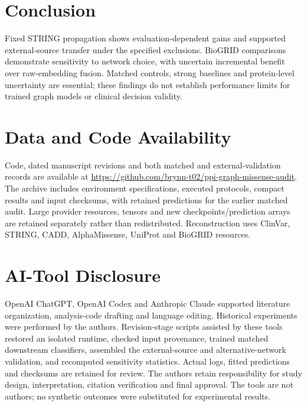 \documentclass[conference]{IEEEtran}
\begin{document}
\section{Conclusion}
Fixed STRING propagation shows evaluation-dependent gains and supported external-source transfer under the specified exclusions. BioGRID comparisons demonstrate sensitivity to network choice, with uncertain incremental benefit over raw-embedding fusion. Matched controls, strong baselines and protein-level uncertainty are essential; these findings do not establish performance limits for trained graph models or clinical decision validity.

\section*{Data and Code Availability}

Code, dated manuscript revisions and both matched and external-validation records are available at \url{https://github.com/brynn-t02/ppi-graph-missense-audit}. The archive includes environment specifications, executed protocols, compact results and input checksums, with retained predictions for the earlier matched audit. Large provider resources, tensors and new checkpoints/prediction arrays are retained separately rather than redistributed. Reconstruction uses ClinVar, STRING, CADD, AlphaMissense, UniProt and BioGRID resources.

\section*{AI-Tool Disclosure}

OpenAI ChatGPT, OpenAI Codex and Anthropic Claude supported literature organization, analysis-code drafting and language editing. Historical experiments were performed by the authors. Revision-stage scripts assisted by these tools restored an isolated runtime, checked input provenance, trained matched downstream classifiers, assembled the external-source and alternative-network validation, and recomputed sensitivity statistics. Actual logs, fitted predictions and checksums are retained for review. The authors retain responsibility for study design, interpretation, citation verification and final approval. The tools are not authors; no synthetic outcomes were substituted for experimental results.
\end{document}
